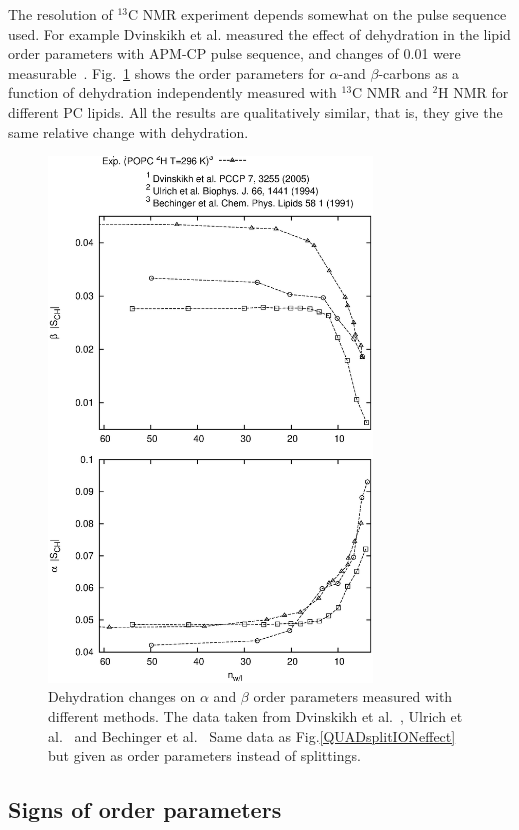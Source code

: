 \documentclass[aps,prl,superscriptaddress,twocolumn]{revtex4}
\begin{document}
The resolution of $^{13}$C NMR experiment depends somewhat on the pulse sequence used. For example Dvinskikh et al. measured the effect of dehydration 
in the lipid order parameters with APM-CP pulse sequence, and changes of 0.01 were measurable~\cite{dvinskikh05b}. Fig.~\ref{opDEHYDeffect} shows the 
order parameters for $\alpha$-and $\beta$-carbons 
as a function of dehydration independently measured with $^{13}$C NMR and $^2$H NMR for different PC lipids. All the results are qualitatively similar, that is, 
they give the same relative change with dehydration.
\begin{figure}[]
  \includegraphics[width=8.6cm]{../Fig/OrderParameterDEHYDexp.eps}
\newline
  \caption{\label{opDEHYDeffect}
    Dehydration changes on $\alpha$ and $\beta$ order parameters measured with different methods. 
    The data taken from Dvinskikh et al.~\cite{dvinskikh05b}, Ulrich et al.~\cite{ulrich94} and Bechinger et al.~\cite{bechinger91}
    Same data as Fig.\ref{QUADsplitIONeffect} but given as order parameters instead of splittings.
  } 
\end{figure}


\subsection{Signs of order parameters}
\end{document}
